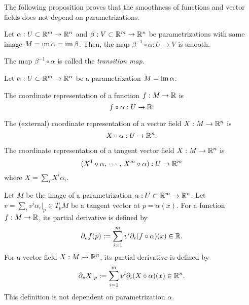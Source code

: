 \documentclass{../../large}
\def\a{\alpha}
\begin{document}
The following proposition proves that the smoothness of functions and vector fields does not depend on parametrizations.

\begin{prop}
Let $\a:U\subset\R^m\to\R^n$ and $\beta:V\subset\mathbb{R}^m\to\mathbb{R}^n$ be parametrizations with same image $M=\im\a=\im\beta$.
Then, the map $\beta^{-1}\circ\a:U\to V$ is smooth.
\end{prop}
\begin{pf}
\end{pf}
\begin{rmk}
The map $\beta^{-1}\circ\a$ is called the \emph{transition map}.
\end{rmk}

\begin{defn}
Let $\a:U\subset\R^m\to\R^n$ be a parametrization $M=\im\a$.
\begin{parts}
\item The coordinate representation of a function $f:M\to\mathbb{R}$ is
\[f\circ\a:U\to\R.\]
\item The (external) coordinate representation of a vector field $X:M\to\mathbb{R}^n$ is
\[X\circ\a:U\to\R^n.\]
\item The coordinate representation of a tangent vector field $X:M\to\mathbb{R}^n$ is
\[(X^1\circ\a,\,\cdots,\,X^m\circ\a):U\to\R^m\]
where $X=\sum_iX^i\a_i$.
\end{parts}
\end{defn}



\begin{defn}
Let $M$ be the image of a parametrization $\a:U\subset\R^m\to\R^n$.
Let $v=\sum_iv^i\a_i|_p\in T_pM$ be a tangent vector at $p=\a(x)$.
For a function $f:M\to\mathbb{R}$, its partial derivative is defined by
\[\pd_vf(p):=\sum_{i=1}^mv^i\pd_i(f\circ\a)(x)\in\R.\]
For a vector field $X:M\to\mathbb{R}^n$, its partial derivative is defined by
\[\pd_vX|_p:=\sum_{i=1}^mv^i\pd_i(X\circ\a)(x)\in\R^n.\]
This definition is not dependent on parametrization $\a$.
\end{defn}
\end{document}
